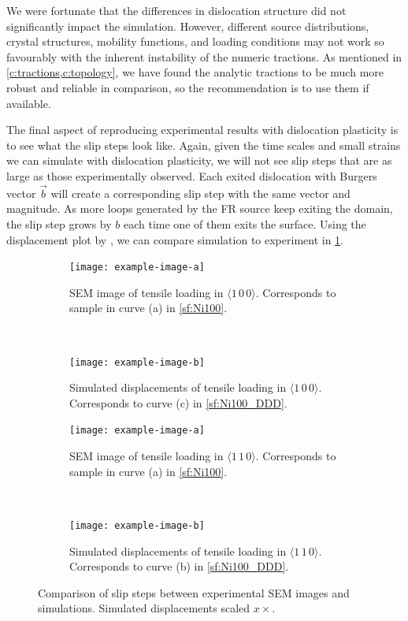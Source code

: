 We were fortunate that the differences in dislocation structure did not significantly impact the simulation. However, different source distributions, crystal structures, mobility functions, and loading conditions may not work so favourably with the inherent instability of the numeric tractions. As mentioned in \cref{c:tractions,c:topology}, we have found the analytic tractions to be much more robust and reliable in comparison, so the recommendation is to use them if available.

The final aspect of reproducing experimental results with dislocation plasticity is to see what the slip steps look like. Again, given the time scales and small strains we can simulate with dislocation plasticity, we will not see slip steps that are as large as those experimentally observed. Each exited dislocation with Burgers vector $\vec{b}$ will create a corresponding slip step with the same vector and magnitude. As more loops generated by the FR source keep exiting the domain, the slip step grows by $b$ each time one of them exits the surface. Using the displacement plot by \citet{bromage2018calculating}, we can compare simulation to experiment in \cref{f:slipSteps}.
\begin{figure}
    \centering
    \begin{subfigure}[t]{0.45\linewidth}
        \centering
        \texttt{[image: example-image-a]}
        \caption[SEM image of tensile loading in $\langle 1\, 0\, 0 \rangle$.]{SEM image of tensile loading in $\langle 1\, 0\, 0 \rangle$. Corresponds to sample in curve (a) in \cref{sf:Ni100}.}
    \end{subfigure}
    ~
    \begin{subfigure}[t]{0.45\linewidth}
        \centering
        \texttt{[image: example-image-b]}
        \caption[Simulated displacements of tensile loading in $\langle 1\, 0\, 0 \rangle$.]{Simulated displacements of tensile loading in $\langle 1\, 0\, 0 \rangle$. Corresponds to curve (c) in \cref{sf:Ni100_DDD}.}
    \end{subfigure}

    \begin{subfigure}[t]{0.45\linewidth}
        \centering
        \texttt{[image: example-image-a]}
        \caption[SEM image of tensile loading in $\langle 1\, 1\, 0 \rangle$.]{SEM image of tensile loading in $\langle 1\, 1\, 0 \rangle$. Corresponds to sample in curve (a) in \cref{sf:Ni100}.}
    \end{subfigure}
    ~
    \begin{subfigure}[t]{0.45\linewidth}
        \centering
        \texttt{[image: example-image-b]}
        \caption[Simulated displacements of tensile loading in $\langle 1\, 1\, 0 \rangle$.]{Simulated displacements of tensile loading in $\langle 1\, 1\, 0 \rangle$. Corresponds to curve (b) in \cref{sf:Ni100_DDD}.}
    \end{subfigure}
    \caption{Comparison of slip steps between experimental SEM images and simulations. Simulated displacements scaled $x \times$.}
    \label{f:slipSteps}
\end{figure}
